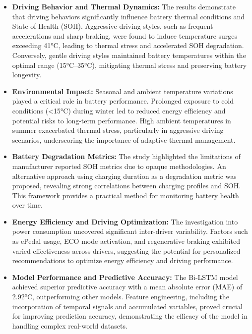 \begin{itemize}

\item \textbf{Driving Behavior and Thermal Dynamics:}
The results demonstrate that driving behaviors significantly influence battery thermal conditions and State of Health (\gls{SOH}). 
Aggressive driving styles, such as frequent accelerations and sharp braking, were found to induce temperature surges exceeding 41°C, leading to thermal stress and accelerated \gls{SOH} degradation. 
Conversely, gentle driving styles maintained battery temperatures within the optimal range (15°C–35°C), mitigating thermal stress and preserving battery longevity.

\item \textbf{Environmental Impact:}
Seasonal and ambient temperature variations played a critical role in battery performance. 
Prolonged exposure to cold conditions (<15°C) during winter led to reduced energy efficiency and potential risks to long-term performance. 
High ambient temperatures in summer exacerbated thermal stress, particularly in aggressive driving scenarios, underscoring the importance of adaptive thermal management.

\item \textbf{Battery Degradation Metrics:}
The study highlighted the limitations of manufacturer reported \gls{SOH} metrics due to opaque methodologies. 
An alternative approach using charging duration as a degradation metric was proposed, revealing strong correlations between charging profiles and \gls{SOH}. 
This framework provides a practical method for monitoring battery health over time.

\item \textbf{Energy Efficiency and Driving Optimization:}
The investigation into power consumption uncovered significant inter-driver variability. 
Factors such as ePedal usage, \gls{ECO} mode activation, and regenerative braking exhibited varied effectiveness across drivers, suggesting the potential for personalized recommendations to optimize energy efficiency and driving performance.

\item \textbf{Model Performance and Predictive Accuracy:}
The \gls{Bi-LSTM} model achieved superior predictive accuracy with a mean absolute error (\gls{MAE}) of 2.92°C, outperforming other models. 
Feature engineering, including the incorporation of temporal signals and accumulated variables, proved crucial for improving prediction accuracy, demonstrating the efficacy of the model in handling complex real-world datasets.


\end{itemize}
